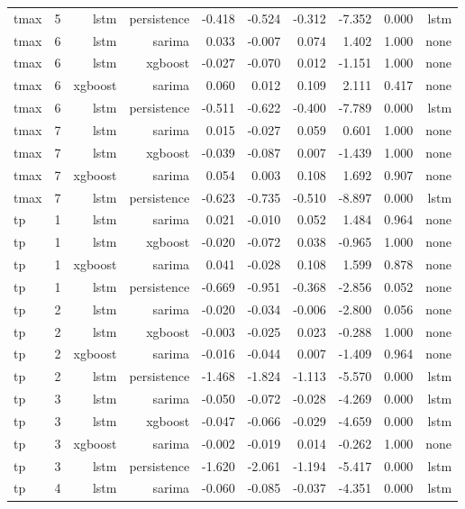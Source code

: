 \begin{table}[t]
\begin{tabular}{llrrrrrrrr}
tmax & 5 & lstm & persistence & -0.418 & -0.524 & -0.312 & -7.352 & 0.000 & lstm \\
tmax & 6 & lstm & sarima & 0.033 & -0.007 & 0.074 & 1.402 & 1.000 & none \\
tmax & 6 & lstm & xgboost & -0.027 & -0.070 & 0.012 & -1.151 & 1.000 & none \\
tmax & 6 & xgboost & sarima & 0.060 & 0.012 & 0.109 & 2.111 & 0.417 & none \\
tmax & 6 & lstm & persistence & -0.511 & -0.622 & -0.400 & -7.789 & 0.000 & lstm \\
tmax & 7 & lstm & sarima & 0.015 & -0.027 & 0.059 & 0.601 & 1.000 & none \\
tmax & 7 & lstm & xgboost & -0.039 & -0.087 & 0.007 & -1.439 & 1.000 & none \\
tmax & 7 & xgboost & sarima & 0.054 & 0.003 & 0.108 & 1.692 & 0.907 & none \\
tmax & 7 & lstm & persistence & -0.623 & -0.735 & -0.510 & -8.897 & 0.000 & lstm \\
tp & 1 & lstm & sarima & 0.021 & -0.010 & 0.052 & 1.484 & 0.964 & none \\
tp & 1 & lstm & xgboost & -0.020 & -0.072 & 0.038 & -0.965 & 1.000 & none \\
tp & 1 & xgboost & sarima & 0.041 & -0.028 & 0.108 & 1.599 & 0.878 & none \\
tp & 1 & lstm & persistence & -0.669 & -0.951 & -0.368 & -2.856 & 0.052 & none \\
tp & 2 & lstm & sarima & -0.020 & -0.034 & -0.006 & -2.800 & 0.056 & none \\
tp & 2 & lstm & xgboost & -0.003 & -0.025 & 0.023 & -0.288 & 1.000 & none \\
tp & 2 & xgboost & sarima & -0.016 & -0.044 & 0.007 & -1.409 & 0.964 & none \\
tp & 2 & lstm & persistence & -1.468 & -1.824 & -1.113 & -5.570 & 0.000 & lstm \\
tp & 3 & lstm & sarima & -0.050 & -0.072 & -0.028 & -4.269 & 0.000 & lstm \\
tp & 3 & lstm & xgboost & -0.047 & -0.066 & -0.029 & -4.659 & 0.000 & lstm \\
tp & 3 & xgboost & sarima & -0.002 & -0.019 & 0.014 & -0.262 & 1.000 & none \\
tp & 3 & lstm & persistence & -1.620 & -2.061 & -1.194 & -5.417 & 0.000 & lstm \\
tp & 4 & lstm & sarima & -0.060 & -0.085 & -0.037 & -4.351 & 0.000 & lstm \\

\end{tabular}
\end{table}
